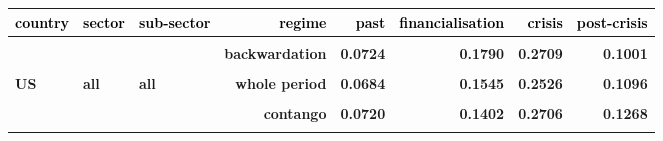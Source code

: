 \documentclass[
  authoryear,
  preprint,
  3p]{elsarticle}
\begin{document}
\begin{longtable}[t]{>{}l>{}l>{}l>{}r>{}r>{}r>{}r>{}r}
\toprule
\textcolor{black}{\textbf{country}} & \textcolor{black}{\textbf{sector}} & \textcolor{black}{\textbf{sub-sector}} & \textcolor{black}{\textbf{regime}} & \textcolor{black}{\textbf{past}} & \textcolor{black}{\textbf{financialisation}} & \textcolor{black}{\textbf{crisis}} & \textcolor{black}{\textbf{post-crisis}}\\
\midrule
\textbf{\cellcolor{gray!10}{all}} & \textbf{\cellcolor{gray!10}{all}} & \textbf{\cellcolor{gray!10}{all}} & \textbf{\cellcolor{gray!10}{whole period}} & \textcolor[HTML]{4285f4}{\textbf{\cellcolor{gray!10}{0.0737}}} & \textcolor[HTML]{4285f4}{\textbf{\cellcolor{gray!10}{0.1638}}} & \textcolor[HTML]{4285f4}{\textbf{\cellcolor{gray!10}{0.2849}}} & \textcolor[HTML]{4285f4}{\textbf{\cellcolor{gray!10}{0.1282}}}\\
\textbf{} & \textbf{} & \textbf{} & \textbf{backwardation} & \textcolor[HTML]{4285f4}{\textbf{0.0724}} & \textcolor[HTML]{4285f4}{\textbf{0.1790}} & \textcolor[HTML]{4285f4}{\textbf{0.2709}} & \textcolor[HTML]{4285f4}{\textbf{0.1001}}\\
\textbf{\cellcolor{gray!10}{}} & \textbf{\cellcolor{gray!10}{}} & \textbf{\cellcolor{gray!10}{}} & \textbf{\cellcolor{gray!10}{contango}} & \textcolor[HTML]{4285f4}{\textbf{\cellcolor{gray!10}{0.0748}}} & \textcolor[HTML]{4285f4}{\textbf{\cellcolor{gray!10}{0.1501}}} & \textcolor[HTML]{4285f4}{\textbf{\cellcolor{gray!10}{0.2985}}} & \textcolor[HTML]{4285f4}{\textbf{\cellcolor{gray!10}{0.1495}}}\\
\textbf{US} & \textbf{all} & \textbf{all} & \textbf{whole period} & \textcolor[HTML]{4285f4}{\textbf{0.0684}} & \textcolor[HTML]{4285f4}{\textbf{0.1545}} & \textcolor[HTML]{4285f4}{\textbf{0.2526}} & \textcolor[HTML]{4285f4}{\textbf{0.1096}}\\
\textbf{\cellcolor{gray!10}{}} & \textbf{\cellcolor{gray!10}{}} & \textbf{\cellcolor{gray!10}{}} & \textbf{\cellcolor{gray!10}{backwardation}} & \textcolor[HTML]{4285f4}{\textbf{\cellcolor{gray!10}{0.0642}}} & \textcolor[HTML]{4285f4}{\textbf{\cellcolor{gray!10}{0.1697}}} & \textcolor[HTML]{4285f4}{\textbf{\cellcolor{gray!10}{0.2323}}} & \textcolor[HTML]{4285f4}{\textbf{\cellcolor{gray!10}{0.0859}}}\\
\addlinespace
\textbf{} & \textbf{} & \textbf{} & \textbf{contango} & \textcolor[HTML]{4285f4}{\textbf{0.0720}} & \textcolor[HTML]{4285f4}{\textbf{0.1402}} & \textcolor[HTML]{4285f4}{\textbf{0.2706}} & \textcolor[HTML]{4285f4}{\textbf{0.1268}}\\
\textbf{\cellcolor{gray!10}{}} & \textbf{\cellcolor{gray!10}{agriculturals}} & \textbf{\cellcolor{gray!10}{all}} & \textbf{\cellcolor{gray!10}{whole period}} & \textcolor[HTML]{4285f4}{\textbf{\cellcolor{gray!10}{0.0910}}} & \textcolor[HTML]{4285f4}{\textbf{\cellcolor{gray!10}{0.1305}}} & \textcolor[HTML]{4285f4}{\textbf{\cellcolor{gray!10}{0.2322}}} & \textcolor[HTML]{4285f4}{\textbf{\cellcolor{gray!10}{0.1075}}}\\

\end{longtable}
\end{document}
